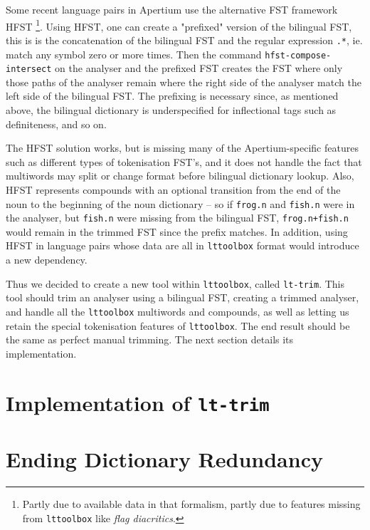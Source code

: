 \documentclass[10pt, a4paper]{article}
\newcommand{\ana}[1]{\texttt{#1}}
\newcommand{\tool}[1]{\texttt{#1}}
\begin{document}
Some recent language pairs in Apertium use the alternative FST
framework HFST \cite{linden2011hfst}\footnote{Partly due to available
data in that formalism, partly due to features missing from
\tool{lttoolbox} like \emph{flag diacritics}.}. Using HFST, one can
create a "prefixed" version of the bilingual FST, this is is the
concatenation of the bilingual FST and the regular expression
\texttt{.*}, ie. match any symbol zero or more times. Then the command
\tool{hfst-compose-intersect} on the analyser and the prefixed FST
creates the FST where only those paths of the analyser remain where
the right side of the analyser match the left side of the bilingual
FST. The prefixing is necessary since, as mentioned above, the
bilingual dictionary is underspecified for inflectional tags such as
definiteness, and so on.

The HFST solution works, but is missing many of the Apertium-specific
features such as different types of tokenisation FST's, and it does
not handle the fact that multiwords may split or change format before
bilingual dictionary lookup. Also, HFST represents compounds with an
optional transition from the end of the noun to the beginning of the
noun dictionary -- so if \ana{frog.n} and \ana{fish.n} were in the
analyser, but \ana{fish.n} were missing from the bilingual FST,
\ana{frog.n+fish.n} would remain in the trimmed FST since the prefix
matches. In addition, using HFST in language pairs whose data are all
in \tool{lttoolbox} format would introduce a new dependency.

Thus we decided to create a new tool within \tool{lttoolbox}, called
\tool{lt-trim}. This tool should trim an analyser using a bilingual
FST, creating a trimmed analyser, and handle all the \tool{lttoolbox}
multiwords and compounds, as well as letting us retain the special
tokenisation features of \tool{lttoolbox}. The end result should be
the same as perfect manual trimming. The next section details its
implementation.


\section{Implementation of \tool{lt-trim}}


\section{Ending Dictionary Redundancy}
\end{document}
